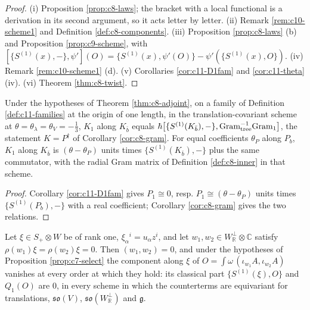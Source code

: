 \begin{proof}
(i) Proposition \ref{prop:c8-laws}; the bracket with a local functional is a derivation in its second argument, so it acts letter by letter. (ii) Remark \ref{rem:c10-scheme1} and Definition \ref{def:c8-components}. (iii) Proposition \ref{prop:c8-laws} (b) and Proposition \ref{prop:c9-scheme}, with $[\{S^{(1)}(x),-\},\psi'](O)=\{S^{(1)}(x),\psi'(O)\}-\psi'(\{S^{(1)}(x),O\})$. (iv) Remark \ref{rem:c10-scheme1} (d). (v) Corollaries \ref{cor:c11-D1fam} and \ref{cor:c11-theta} (iv). (vi) Theorem \ref{thm:c8-twist}.
\end{proof}

\begin{corollary}
\label{cor:c11-K}
Under the hypotheses of Theorem \ref{thm:c8-adjoint}, on a family of Definition \ref{def:c11-families} at the origin of one length, in the translation-covariant scheme at $\theta=\theta_\lambda=\theta_V=-\tfrac13$, $K_1$ along $K_{\bar b}$ equals $\hbar\big[\{S^{(1)}(K_{\bar b}),-\},\mathrm{Gram}_{\rm tree}^{-1}\mathrm{Gram}_{\rm 1}\big]$, the statement $K=P^\dagger$ of Corollary \ref{cor:c8-gram}. For equal coefficients $\theta_P$ along $P_b$, $K_1$ along $K_{\bar b}$ is $(\theta-\theta_P)$ units times $\{S^{(1)}(K_{\bar b}),-\}$ plus the same commutator, with the radial Gram matrix of Definition \ref{def:c8-inner} in that scheme.
\end{corollary}

\begin{proof}
Corollary \ref{cor:c11-D1fam} gives $P_1\cong0$, resp. $P_1\cong(\theta-\theta_P)$ units times $\{S^{(1)}(P_b),-\}$ with a real coefficient; Corollary \ref{cor:c8-gram} gives the two relations.
\end{proof}

\begin{proposition}
\label{prop:c11-plane}
Let $\xi\in S_+\otimes W$ be of rank one, $\xi_\alpha{}^i=u_\alpha z^i$, and let $w_1,w_2\in W_{\mathbb R}^\perp\otimes\mathbb C$ satisfy $\rho(w_1)\xi=\rho(w_2)\xi=0$. Then $(w_1,w_2)=0$, and under the hypotheses of Proposition \ref{prop:c7-select} the component along $\xi$ of $O=\int\omega\,(\iota_{w_1}A,\iota_{w_2}A)$ vanishes at every order at which they hold: its classical part $\{S^{(1)}(\xi),O\}$ and $Q_1(O)$ are $0$, in every scheme in which the counterterms are equivariant for translations, $\mathfrak{so}(V)$, $\mathfrak{so}(W_{\mathbb R}^\perp)$ and $\mathfrak g$.
\end{proposition}

